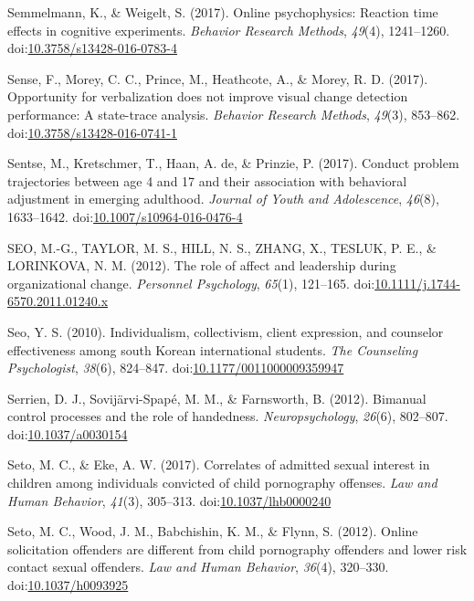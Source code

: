 \documentclass[english,man]{apa6}
\begin{document}
\hypertarget{ref-Semmelmann2017}{}
Semmelmann, K., \& Weigelt, S. (2017). Online psychophysics: Reaction
time effects in cognitive experiments. \emph{Behavior Research Methods},
\emph{49}(4), 1241--1260.
doi:\href{https://doi.org/10.3758/s13428-016-0783-4}{10.3758/s13428-016-0783-4}

\hypertarget{ref-Sense2013}{}
Sense, F., Morey, C. C., Prince, M., Heathcote, A., \& Morey, R. D.
(2017). Opportunity for verbalization does not improve visual change
detection performance: A state-trace analysis. \emph{Behavior Research
Methods}, \emph{49}(3), 853--862.
doi:\href{https://doi.org/10.3758/s13428-016-0741-1}{10.3758/s13428-016-0741-1}

\hypertarget{ref-Sentse2017}{}
Sentse, M., Kretschmer, T., Haan, A. de, \& Prinzie, P. (2017). Conduct
problem trajectories between age 4 and 17 and their association with
behavioral adjustment in emerging adulthood. \emph{Journal of Youth and
Adolescence}, \emph{46}(8), 1633--1642.
doi:\href{https://doi.org/10.1007/s10964-016-0476-4}{10.1007/s10964-016-0476-4}

\hypertarget{ref-Seo2012}{}
SEO, M.-G., TAYLOR, M. S., HILL, N. S., ZHANG, X., TESLUK, P. E., \&
LORINKOVA, N. M. (2012). The role of affect and leadership during
organizational change. \emph{Personnel Psychology}, \emph{65}(1),
121--165.
doi:\href{https://doi.org/10.1111/j.1744-6570.2011.01240.x}{10.1111/j.1744-6570.2011.01240.x}

\hypertarget{ref-Seo2010}{}
Seo, Y. S. (2010). Individualism, collectivism, client expression, and
counselor effectiveness among south Korean international students.
\emph{The Counseling Psychologist}, \emph{38}(6), 824--847.
doi:\href{https://doi.org/10.1177/0011000009359947}{10.1177/0011000009359947}

\hypertarget{ref-Serrien2012}{}
Serrien, D. J., Sovijärvi-Spapé, M. M., \& Farnsworth, B. (2012).
Bimanual control processes and the role of handedness.
\emph{Neuropsychology}, \emph{26}(6), 802--807.
doi:\href{https://doi.org/10.1037/a0030154}{10.1037/a0030154}

\hypertarget{ref-Seto2017}{}
Seto, M. C., \& Eke, A. W. (2017). Correlates of admitted sexual
interest in children among individuals convicted of child pornography
offenses. \emph{Law and Human Behavior}, \emph{41}(3), 305--313.
doi:\href{https://doi.org/10.1037/lhb0000240}{10.1037/lhb0000240}

\hypertarget{ref-Seto2012}{}
Seto, M. C., Wood, J. M., Babchishin, K. M., \& Flynn, S. (2012). Online
solicitation offenders are different from child pornography offenders
and lower risk contact sexual offenders. \emph{Law and Human Behavior},
\emph{36}(4), 320--330.
doi:\href{https://doi.org/10.1037/h0093925}{10.1037/h0093925}
\end{document}
